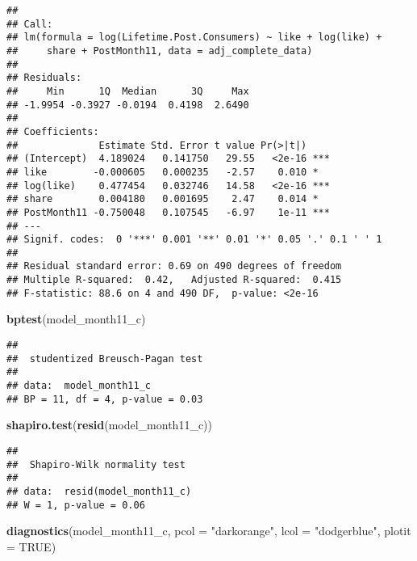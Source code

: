 \documentclass[
]{article}
\newenvironment{Shaded}{\begin{snugshade}}{\end{snugshade}}
\newcommand{\DataTypeTok}[1]{\textcolor[rgb]{0.13,0.29,0.53}{#1}}
\newcommand{\KeywordTok}[1]{\textcolor[rgb]{0.13,0.29,0.53}{\textbf{#1}}}
\newcommand{\NormalTok}[1]{#1}
\newcommand{\OtherTok}[1]{\textcolor[rgb]{0.56,0.35,0.01}{#1}}
\newcommand{\StringTok}[1]{\textcolor[rgb]{0.31,0.60,0.02}{#1}}
\begin{document}
\begin{verbatim}
## 
## Call:
## lm(formula = log(Lifetime.Post.Consumers) ~ like + log(like) + 
##     share + PostMonth11, data = adj_complete_data)
## 
## Residuals:
##     Min      1Q  Median      3Q     Max 
## -1.9954 -0.3927 -0.0194  0.4198  2.6490 
## 
## Coefficients:
##              Estimate Std. Error t value Pr(>|t|)    
## (Intercept)  4.189024   0.141750   29.55   <2e-16 ***
## like        -0.000605   0.000235   -2.57    0.010 *  
## log(like)    0.477454   0.032746   14.58   <2e-16 ***
## share        0.004180   0.001695    2.47    0.014 *  
## PostMonth11 -0.750048   0.107545   -6.97    1e-11 ***
## ---
## Signif. codes:  0 '***' 0.001 '**' 0.01 '*' 0.05 '.' 0.1 ' ' 1
## 
## Residual standard error: 0.69 on 490 degrees of freedom
## Multiple R-squared:  0.42,   Adjusted R-squared:  0.415 
## F-statistic: 88.6 on 4 and 490 DF,  p-value: <2e-16
\end{verbatim}

\begin{Shaded}
\begin{Highlighting}[]
\KeywordTok{bptest}\NormalTok{(model_month11_c)}
\end{Highlighting}
\end{Shaded}

\begin{verbatim}
## 
##  studentized Breusch-Pagan test
## 
## data:  model_month11_c
## BP = 11, df = 4, p-value = 0.03
\end{verbatim}

\begin{Shaded}
\begin{Highlighting}[]
\KeywordTok{shapiro.test}\NormalTok{(}\KeywordTok{resid}\NormalTok{(model_month11_c))}
\end{Highlighting}
\end{Shaded}

\begin{verbatim}
## 
##  Shapiro-Wilk normality test
## 
## data:  resid(model_month11_c)
## W = 1, p-value = 0.06
\end{verbatim}

\begin{Shaded}
\begin{Highlighting}[]
\KeywordTok{diagnostics}\NormalTok{(model_month11_c, }\DataTypeTok{pcol =} \StringTok{"darkorange"}\NormalTok{, }\DataTypeTok{lcol =} \StringTok{"dodgerblue"}\NormalTok{, }\DataTypeTok{plotit =} \OtherTok{TRUE}\NormalTok{)}
\end{Highlighting}
\end{Shaded}
\end{document}
